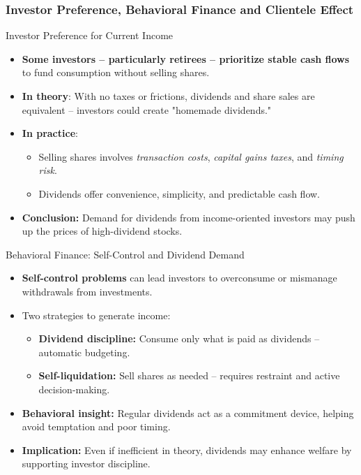 \subsubsection{Investor Preference, Behavioral Finance and Clientele Effect}
\begin{frame}{Investor Preference for Current Income}
\footnotesize
\begin{itemize}
    \item \textbf{Some investors -- particularly retirees -- prioritize stable cash flows} to fund consumption without selling shares.

    \item \textbf{In theory}: With no taxes or frictions, dividends and share sales are equivalent -- investors could create "homemade dividends."

    \item \textbf{In practice}:
    \begin{itemize}
        \item Selling shares involves \textit{transaction costs}, \textit{capital gains taxes}, and \textit{timing risk}.
        \item Dividends offer convenience, simplicity, and predictable cash flow.
    \end{itemize}

    \item \textbf{Conclusion:} Demand for dividends from income-oriented investors may push up the prices of high-dividend stocks.
\end{itemize}
\end{frame}

\begin{frame}{Behavioral Finance: Self-Control and Dividend Demand}
\footnotesize
\begin{itemize}
    \item \textbf{Self-control problems} can lead investors to overconsume or mismanage withdrawals from investments.

    \item Two strategies to generate income:
    \begin{itemize}
        \item \textbf{Dividend discipline:} Consume only what is paid as dividends -- automatic budgeting.
        \item \textbf{Self-liquidation:} Sell shares as needed -- requires restraint and active decision-making.
    \end{itemize}

    \item \textbf{Behavioral insight:} Regular dividends act as a commitment device, helping avoid temptation and poor timing.

    \item \textbf{Implication:} Even if inefficient in theory, dividends may enhance welfare by supporting investor discipline.
\end{itemize}
\end{frame}

